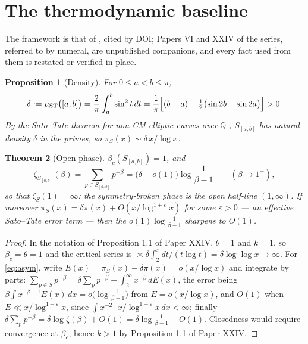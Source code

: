 \documentclass[11pt]{amsart}
\numberwithin{equation}{section}
\newtheorem{theorem}{Theorem}[section]
\newtheorem{proposition}[theorem]{Proposition}
\theoremstyle{definition}
\theoremstyle{remark}
\newcommand{\Q}{\mathbb{Q}}
\newcommand{\ST}{\mathrm{ST}}
\begin{document}
\begin{abstract}
We flag one technical point that the $L^2$ expansion conceals: $\mathbf 1_{[a,b]}$ is not
smooth, so the interchange of $\sum_k$ and $\sum_p$ requires a Beurling--Selberg smoothing,
standard in equidistribution but not vacuous.
\end{abstract}

\maketitle

\section{The thermodynamic baseline}

The framework is that of \cite{Main}, cited by DOI; Papers VI and XXIV of the series,
referred to by numeral, are unpublished companions, and every fact used from them is
restated or verified in place.

\begin{proposition}[Density]\label{prop:density}
For $0\le a<b\le\pi$,
\[
\delta:=\mu_\ST\bigl([a,b]\bigr)=\frac{2}{\pi}\int_a^b\sin^2t\,dt
=\frac{1}{\pi}\Bigl[(b-a)-\tfrac12\bigl(\sin2b-\sin2a\bigr)\Bigr]>0 .
\]
By the Sato--Tate theorem for non-CM elliptic curves over $\Q$ \cite{BLGHT}, $S_{[a,b]}$ has natural
density $\delta$ in the primes, so $\pi_S(x)\sim\delta\,x/\log x$.
\end{proposition}

\begin{theorem}[Open phase]\label{thm:open}
$\beta_c(S_{[a,b]})=1$, and
\begin{equation}\label{eq:asym}
\zeta_{S_{[a,b]}}(\beta)=\sum_{p\in S_{[a,b]}}p^{-\beta}=\bigl(\delta+o(1)\bigr)\log\frac{1}{\beta-1}
\qquad(\beta\to1^+),
\end{equation}
so that $\zeta_S(1)=\infty$: the symmetry-broken phase is the \emph{open} half-line
$(1,\infty)$. If moreover $\pi_S(x)=\delta\pi(x)+O(x/\log^{1+\varepsilon}x)$ for some
$\varepsilon>0$ --- an effective Sato--Tate error term --- then the $o(1)\log\frac1{\beta-1}$
sharpens to $O(1)$.
\end{theorem}

\begin{proof}
In the notation of Proposition 1.1 of Paper XXIV, $\theta=1$ and $k=1$, so $\beta_c=\theta=1$
and the critical series is $\asymp\delta\int_2^xdt/(t\log t)=\delta\log\log x\to\infty$. For
\eqref{eq:asym}, write $E(x)=\pi_S(x)-\delta\pi(x)=o(x/\log x)$ and integrate by parts:
$\sum_{p\in S}p^{-\beta}=\delta\sum_pp^{-\beta}+\int_2^\infty x^{-\beta}\,dE(x)$, the
error being $\beta\int x^{-\beta-1}E(x)\,dx=o\bigl(\log\frac1{\beta-1}\bigr)$ from
$E=o(x/\log x)$, and $O(1)$ when $E\ll x/\log^{1+\varepsilon}x$, since
$\int x^{-2}\cdot x/\log^{1+\varepsilon}x\,dx<\infty$; finally
$\delta\sum_pp^{-\beta}=\delta\log\zeta(\beta)+O(1)=\delta\log\frac{1}{\beta-1}+O(1)$. Closedness would require
convergence at $\beta_c$, hence $k>1$ by Proposition 1.1 of Paper XXIV.
\end{proof}
\end{document}
